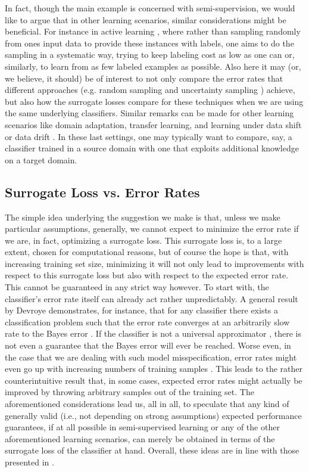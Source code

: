 \documentclass[twoside]{memoir}\usepackage[]{graphicx}\usepackage{xcolor}
\renewcommand{\cite}{\citep}
\begin{document}
In fact, though the main example is concerned with semi-supervision, we would like to argue that in other learning scenarios, similar considerations might be beneficial.  For instance in active learning \cite{settles2010active}, where rather than sampling randomly from ones input data to provide these instances with labels, one aims to do the sampling in a systematic way, trying to keep labeling cost as low as one can or, similarly, to learn from as few labeled examples as possible.  Also here it may (or, we believe, it should) be of interest to not only compare the error rates that different approaches (e.g. random sampling and uncertainty sampling \cite{lewis1994sequential}) achieve, but also how the surrogate losses compare for these techniques when we are using the same underlying classifiers.  Similar remarks can be made for other learning scenarios like domain adaptation, transfer learning, and learning under data shift or data drift \cite{margolis2011literature,torrey2009transfer,Quinonero-Candela2009,vzliobaite2010learning}.  In these last settings, one may typically want to compare, say, a classifier trained in a source domain with one that exploits additional knowledge on a target domain.


\subsection{Surrogate Loss vs. Error Rates}

The simple idea underlying the suggestion we make is that, unless we make particular assumptions, generally, we cannot expect to minimize the error rate if we are, in fact, optimizing a surrogate loss.  This surrogate loss is, to a large extent, chosen for computational reasons, but of course the hope is that, with increasing training set size, minimizing it will not only lead to improvements with respect to this surrogate loss but also with respect to the expected error rate.  This cannot be guaranteed in any strict way however.  To start with, the classifier's error rate itself can already act rather unpredictably.  A general result by Devroye demonstrates, for instance, that for any classifier there exists a classification problem such that the error rate converges at an arbitrarily slow rate to the Bayes error \cite{Devroye1982}.  If the classifier is not a universal approximator \cite{devroye1996probabilistic,steinwart05}, there is not even a guarantee that the Bayes error will ever be reached.  Worse even, in the case that we are dealing with such model misspecification, error rates might even go up with increasing numbers of training samples \cite{Loog2012}. This leads to the rather counterintuitive result that, in some cases, expected error rates might actually be improved by throwing arbitrary samples out of the training set.  The aforementioned considerations lead us, all in all, to speculate that any kind of generally valid (i.e., not depending on strong assumptions) expected performance guarantees, if at all possible in semi-supervised learning or any of the other aforementioned learning scenarios, can merely be obtained in terms of the surrogate loss of the classifier at hand.  Overall, these ideas are in line with those presented in \cite{Loog2014b}.
\end{document}
